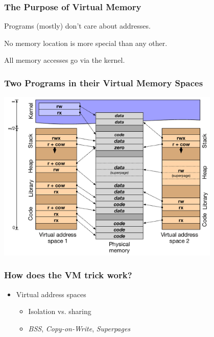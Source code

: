 \documentclass[pdftex]{beamer} %
\begin{document}
\begin{frame}
  \frametitle{The Purpose of Virtual Memory}
  \begin{description}[labelwidth=\widthof{Simplification}]
  \item [Simplification] Programs (mostly) don't care about addresses.
  \item [Portability] No memory location is more special than any other.
  \item [Protection] All memory accesses go via the kernel.
  \end{description}
\end{frame}

\begin{frame}
  \frametitle{Two Programs in their Virtual Memory Spaces}

  \begin{center}
    \includegraphics[width=0.8\textwidth]{../../figures/process-address-space.pdf}
  \end{center}
\end{frame}

\begin{frame}
  \frametitle{How does the VM trick work?}

  \begin{itemize}
  \item Virtual address spaces
    \begin{itemize}
    \item Isolation vs. sharing
    \item \textit{BSS}, \textit{Copy-on-Write}, \textit{Superpages}
    \end{itemize}
  \end{itemize}
\end{frame}
\end{document}
